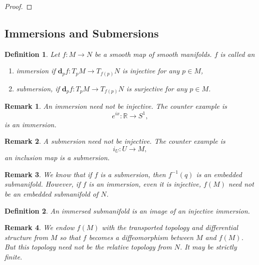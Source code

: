 \documentclass{article}
\newtheorem{definition}{Definition}[section]
\newtheorem{remark}{Remark}[section]
\numberwithin{equation}{section}
\begin{document}
\begin{proof}

\end{proof}

\subsection{Immersions and Submersions}

\begin{definition}
Let $f:M\to N$ be a smooth map of smooth manifolds. $f$ is called an
\begin{enumerate}[1).]
\item immersion if $\mathbf{d}_pf:T_pM\to T_{f(p)}N$ is injective for any $p\in M$,
\item submersion, if $\mathbf{d}_pf:T_pM\to T_{f(p)}N$ is surjective for any $p\in M$.
\end{enumerate}
\end{definition}

\begin{remark}
An immersion need not be injective. The counter example is 
\begin{equation*}
e^{ix}:\mathbb{R}\to S^1,
\end{equation*}
is an immersion.
\end{remark}

\begin{remark}
A submersion need not be injective. The counter example is 
\begin{equation*}
i_U:U\to M,
\end{equation*}
an inclusion map is a submersion.
\end{remark}

\begin{remark}
We know that if $f$ is a submersion, then $f^{-1}(q)$ is an embedded submanifold. However, if $f$ is an immersion, even it is injective,  $f(M)$ need not be an embedded submanifold of $N$.
\end{remark}

\begin{definition}
An immersed submanifold is an image of an injective immersion. 
\end{definition}

\begin{remark}
We endow $f(M)$ with the transported topology and differential structure from $M$ so that $f$ becomes a diffeomorphism between $M$ and $f(M)$. But this topology need not be the relative topology from $N$. It may be strictly finite.
\end{remark}
\end{document}
